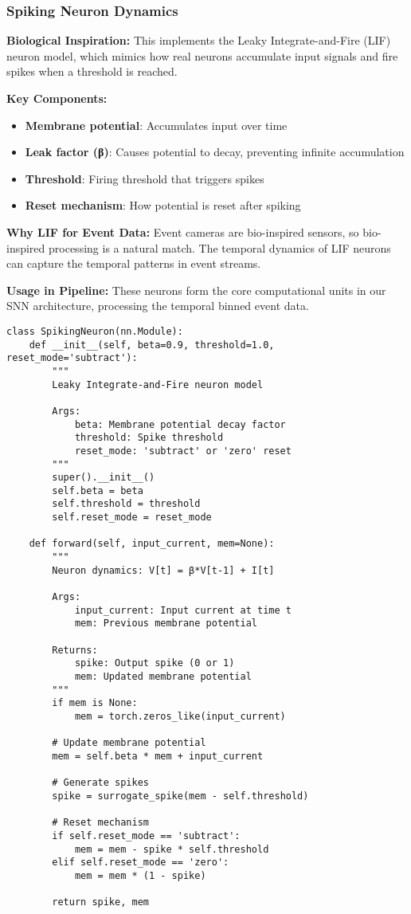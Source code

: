 \documentclass[12pt,a4paper]{article}
\begin{document}
\subsubsection{Spiking Neuron Dynamics}

\textbf{Biological Inspiration:} This implements the Leaky Integrate-and-Fire (LIF) neuron model, which mimics how real neurons accumulate input signals and fire spikes when a threshold is reached.

\textbf{Key Components:}
\begin{itemize}
    \item \textbf{Membrane potential}: Accumulates input over time
    \item \textbf{Leak factor (β)}: Causes potential to decay, preventing infinite accumulation
    \item \textbf{Threshold}: Firing threshold that triggers spikes
    \item \textbf{Reset mechanism}: How potential is reset after spiking
\end{itemize}

\textbf{Why LIF for Event Data:} Event cameras are bio-inspired sensors, so bio-inspired processing is a natural match. The temporal dynamics of LIF neurons can capture the temporal patterns in event streams.

\textbf{Usage in Pipeline:} These neurons form the core computational units in our SNN architecture, processing the temporal binned event data.

\begin{lstlisting}[caption={Spiking Neuron Implementation - LIF Neuron Dynamics}]
class SpikingNeuron(nn.Module):
    def __init__(self, beta=0.9, threshold=1.0, reset_mode='subtract'):
        """
        Leaky Integrate-and-Fire neuron model
        
        Args:
            beta: Membrane potential decay factor
            threshold: Spike threshold
            reset_mode: 'subtract' or 'zero' reset
        """
        super().__init__()
        self.beta = beta
        self.threshold = threshold
        self.reset_mode = reset_mode
    
    def forward(self, input_current, mem=None):
        """
        Neuron dynamics: V[t] = β*V[t-1] + I[t]
        
        Args:
            input_current: Input current at time t
            mem: Previous membrane potential
        
        Returns:
            spike: Output spike (0 or 1)
            mem: Updated membrane potential
        """
        if mem is None:
            mem = torch.zeros_like(input_current)
        
        # Update membrane potential
        mem = self.beta * mem + input_current
        
        # Generate spikes
        spike = surrogate_spike(mem - self.threshold)
        
        # Reset mechanism
        if self.reset_mode == 'subtract':
            mem = mem - spike * self.threshold
        elif self.reset_mode == 'zero':
            mem = mem * (1 - spike)
        
        return spike, mem
\end{lstlisting}
\end{document}

